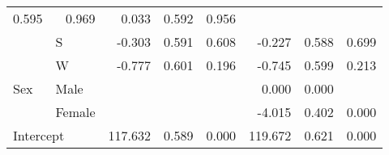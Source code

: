 \begin{table}[!h]
\begin{tabular}{llllllll}
  \multicolumn{1}{r}{0.595} &
  \multicolumn{1}{r}{0.969} &
  \multicolumn{1}{r}{0.033} &
  \multicolumn{1}{r}{0.592} &
  \multicolumn{1}{r}{0.956} \\
\multicolumn{1}{l}{} &
  \multicolumn{1}{l}{S} &
  \multicolumn{1}{r}{-0.303} &
  \multicolumn{1}{r}{0.591} &
  \multicolumn{1}{r}{0.608} &
  \multicolumn{1}{r}{-0.227} &
  \multicolumn{1}{r}{0.588} &
  \multicolumn{1}{r}{0.699} \\
\multicolumn{1}{l}{} &
  \multicolumn{1}{l}{W} &
  \multicolumn{1}{r}{-0.777} &
  \multicolumn{1}{r}{0.601} &
  \multicolumn{1}{r}{0.196} &
  \multicolumn{1}{r}{-0.745} &
  \multicolumn{1}{r}{0.599} &
  \multicolumn{1}{r}{0.213} \\
\multicolumn{1}{l}{Sex} &
  \multicolumn{1}{l}{Male} &
  \multicolumn{1}{r}{} &
  \multicolumn{1}{r}{} &
  \multicolumn{1}{r}{} &
  \multicolumn{1}{r}{0.000} &
  \multicolumn{1}{r}{0.000} &
  \multicolumn{1}{r}{} \\
\multicolumn{1}{l}{} &
  \multicolumn{1}{l}{Female} &
  \multicolumn{1}{r}{} &
  \multicolumn{1}{r}{} &
  \multicolumn{1}{r}{} &
  \multicolumn{1}{r}{-4.015} &
  \multicolumn{1}{r}{0.402} &
  \multicolumn{1}{r}{0.000} \\
\multicolumn{2}{l}{Intercept} &
  \multicolumn{1}{r}{117.632} &
  \multicolumn{1}{r}{0.589} &
  \multicolumn{1}{r}{0.000} &
  \multicolumn{1}{r}{119.672} &
  \multicolumn{1}{r}{0.621} &
  \multicolumn{1}{r}{0.000} \\
\cline{1-8}
\end{tabular}
\end{table}
